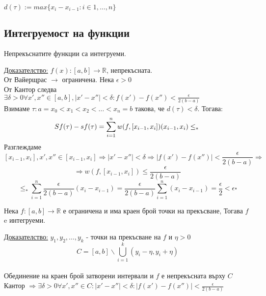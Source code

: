 \documentclass{article}
\newcommand{\tvurdenie}[2]{
    \begin{tcolorbox}[title = #1 ,colframe = blue!70!black, colback = blue!10!white]
        #2
    \end{tcolorbox}
}
\newcommand{\opredelenie}[2]{
    \begin{tcolorbox}[title = #1 ,colframe = red!70!black, colback = red!10!white]
        #2
    \end{tcolorbox}
}
\begin{document}

\opredelenie{Диаметър на $\tau$}{
    $d(\tau):= max\{x_i-x_{i-1} : i \in {1,\dots,n}\}$
}
\subsection*{Интегруемост на функции}

\tvurdenie{Твъдение}{Непрекъснатите функции са интегруеми.}
\underline{Доказателство:} $f(x): [a,b] \to \mathbb{R}$, непрекъсната. \\
От Вайерщрас $\to$ ограничена. Нека $\epsilon > 0 $ \\
От Кантор следва $\exists \delta >0 \forall x',x'' \in [a,b], |x'-x''|<\delta : f(x')-f(x'') < \frac{\epsilon}{2(b-a)}$ \\
Взимаме $\tau: a=x_0<x_1<x_2<\dots<x_n=b$ такова, че $d(\tau)<\delta$. Тогава: \\
\[Sf(\tau)-sf(\tau)=\sum_{i=1}^{n}w(f,
[x_{i-1}, x_i])(x_{i-1}, x_i) \le_{*} \\ \]
Разглеждаме
\[[x_{i-1}, x_i], x', x'' \in [x_{i-1}, x_i] \Rightarrow |x'-x''|<\delta\Rightarrow|f(x')-f(x'')|< \frac{\epsilon}{2(b-a)} \Rightarrow\]
\[\Rightarrow w(f, [x_{i-1}, x_i]) \le \frac{\epsilon}{2(b-a)}\]
\[\le_{*} \sum_{i=1}^{n}\frac{\epsilon}{2(b-a)}(x_i-x_{i-1}) = \frac{\epsilon}{2(b-a)}\sum_{i=1}^{n}(x_i-x_{i-1}) = \frac{\epsilon}{2} < \epsilon \square\]


\tvurdenie{Твърдение}{Нека $f:[a,b] \to \mathbb{R}$ е ограничена и има краен брой точки на прекъсване, Тогава $f$ e интегруеми.}
\underline{Доказателство:} $y_1, y_2,\dots,y_k$ - точки на прекъсване на $f$ и $\eta >0$ \\
\[C=[a,b]\backslash\bigcup_{i=1}^{k}(y_i-\eta,y_i+\eta)\] \\
Обединение на краен брой затворени интервали и $f$ е непрекъсната върху $C$\\
Кантор $\Rightarrow \exists\delta>0\forall x',x'' \in C: |x'-x''|<\delta:|f(x')-f(x'')|<\frac{\epsilon}{2(b-a)}$
\end{document}
